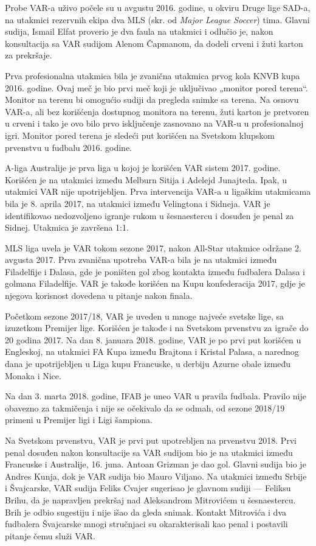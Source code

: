 \documentclass[a4paper]{article}
\begin{document}
Probe VAR-a uživo počele su u avgustu 2016. godine, u okviru Druge lige SAD-a, na utakmici rezervnih ekipa dva MLS (skr. od \emph{Major League Soccer}) tima. Glavni sudija, Ismail Elfat proverio je dva faula na utakmici i odlučio je, nakon konsultacija sa VAR sudijom Alenom Čapmanom, da dodeli crveni i žuti karton za prekršaje.

Prva profesionalna utakmica bila je zvanična utakmica prvog kola KNVB kupa 2016. godine. Ovaj meč je bio prvi meč koji je uključivao „monitor pored terena“. Monitor na terenu bi omogućio sudiji da pregleda snimke sa terena. Na osnovu VAR-a, ali bez korišćenja dostupnog monitora na terenu, žuti karton je pretvoren u crveni i tako je ovo bilo prvo isključenje zasnovano na VAR-u u profesionalnoj igri. Monitor pored terena je sledeći put korišćen na Svetskom klupskom prvenstvu u fudbalu 2016. godine.

A-liga Australije je prva liga u kojoj je korišćen VAR sistem 2017. godine. Korišćen je na utakmici između Melburn Sitija i Adelejd Junajteda. Ipak, u utakmici VAR nije upotrijebljen. Prva intervencija VAR-a u ligaškim utakmicama bila je 8. aprila 2017, na utakmici između Velingtona i Sidneja. VAR je identifikovao nedozvoljeno igranje rukom u šesnaestercu i dosuđen je penal za Sidnej. Utakmica je završena 1:1.

MLS liga uvela je VAR tokom sezone 2017, nakon All-Star utakmice održane 2. avgusta 2017. Prva zvanična upotreba VAR-a bila je na utakmici između Filadelfije i Dalasa, gde je poništen gol zbog kontakta između fudbalera Dalasa i golmana Filadelfije. VAR je takođe korišćen na Kupu konfederacija 2017, gdje je njegova korisnost dovedena u pitanje nakon finala.

Početkom sezone 2017/18, VAR je uveden u mnoge najveće svetske lige, sa izuzetkom Premijer lige. Korišćen je takođe i na Svetskom prvenstvu za igrače do 20 godina 2017. Na dan 8. januara 2018. godine, VAR je po prvi put korišćen u Engleskoj, na utakmici FA Kupa između Brajtona i Kristal Palasa, a narednog dana je upotrijebljen u Liga kupu Francuske, u derbiju Azurne obale između Monaka i Nice.

Na dan 3. marta 2018. godine, IFAB je uneo VAR u pravila fudbala. Pravilo nije obavezno za takmičenja i nije se očekivalo da se odmah, od sezone 2018/19 primeni u Premijer ligi i Ligi šampiona. 

Na Svetskom prvenstvu, VAR je prvi put upotrebljen na prvenstvu 2018. Prvi penal dosuđen nakon konsultacije sa VAR sudijom bio je na utakmici između Francuske i Australije, 16. juna. Antoan Grizman je dao gol. Glavni sudija bio je Andres Kunja, dok je VAR sudija bio Mauro Viljano. Na utakmici između Srbije i Švajcarske, VAR sudija Feliks Cvajer sugerisao je glavnom sudiji — Feliksu Brihu, da je napravljen prekršaj nad Aleksandrom Mitrovićem u šesnaestercu. Brih je odbio sugestiju i nije išao da gleda snimak. Kontakt Mitrovića i dva fudbalera Švajcarske mnogi stručnjaci su okarakterisali kao penal i postavili pitanje čemu služi VAR.
\end{document}
